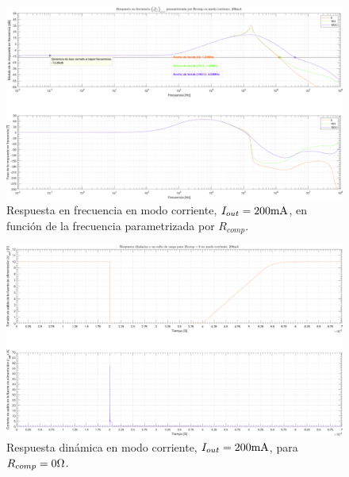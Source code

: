 \clearpage

\begin{figure}[H] %
\begin{center}
\includegraphics[width=1.1 \textwidth, angle=90]{./img/plots/rf/power_supply_RCOMP_RF_Modo4.png}
\caption{\label{fig:fig_power_supply_RCOMP_RF_Modo4}\footnotesize{Respuesta en frecuencia en modo corriente, $I_{out} = 200 \si[per-mode=symbol]{\milli\ampere}$, en función de la frecuencia parametrizada por $R_{comp}$.}}
\end{center}
\end{figure}

\clearpage

\begin{figure}[H] %
\begin{center}
\includegraphics[width=1.1 \textwidth, angle=90]{./img/plots/dynamic/power_supply_RCOMP_0_STEP_Modo4.png}
\caption{\label{fig:fig_power_supply_RCOMP_STEP_0_Modo4}\footnotesize{Respuesta dinámica en modo corriente, $I_{out} = 200 \si[per-mode=symbol]{\milli\ampere}$, para $R_{comp} = 0 \si[per-mode=symbol]{\ohm} $.}}
\end{center}
\end{figure}

